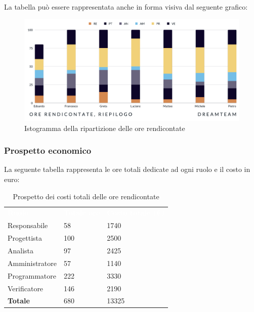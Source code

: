 La tabella può essere rappresentata anche in forma visiva dal seguente grafico:
\begin{figure}[H]
\centering
\includegraphics[scale=0.50]{Sezioni/SezioniPreventivo/grafici/Riepilogo_ore_rendicontate.png}
\caption{Istogramma della ripartizione delle ore rendicontate}
\end{figure}

\subsubsection{Prospetto economico}
La seguente tabella rappresenta le ore totali dedicate ad ogni ruolo e il costo in euro:

\begin{table}[H]
\begin{center}
\renewcommand{\arraystretch}{1.5}
\begin{tabular}{ m{}<{\centering}  m{}<{\centering} m{}<{\centering}}
	\rowcolor{darkblue}
	\textcolor{white}{\textbf{Ruolo}}&\textcolor{white}{\textbf{Totale ore}}&\textcolor{white}{\textbf{Costo totale (\euro)}}\\ 

	Responsabile & 58 & 1740 \\	
	
	Progettista & 100 & 2500 \\
	
	Analista & 97 & 2425 \\

	Amministratore & 57 & 1140 \\
	
	Programmatore & 222 & 3330 \\
	
	Verificatore & 146 & 2190 \\
	
	\textbf{Totale} & 680 & 13325 \\
	
\end{tabular}
\caption{Prospetto dei costi totali delle ore rendicontate}
\end{center}
\end{table}


